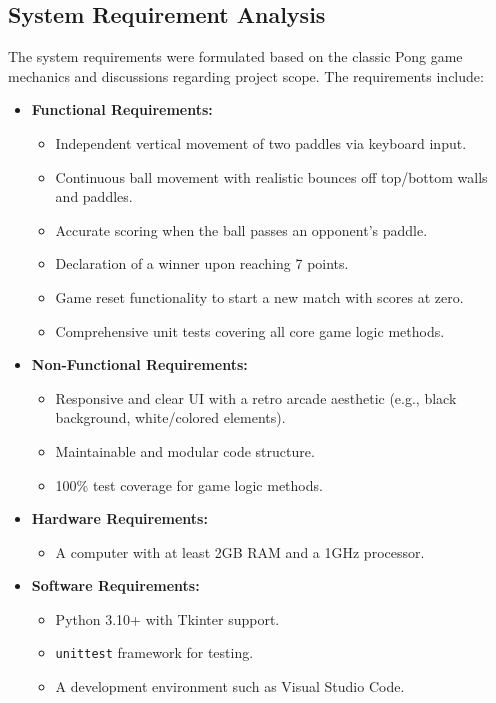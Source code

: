 \documentclass[12pt,a4paper]{article}
\begin{document}
\subsection{System Requirement Analysis}
The system requirements were formulated based on the classic Pong game mechanics and discussions regarding project scope. The requirements include:
\begin{itemize}
    \item \textbf{Functional Requirements:}
    \begin{itemize}
        \item Independent vertical movement of two paddles via keyboard input.
        \item Continuous ball movement with realistic bounces off top/bottom walls and paddles.
        \item Accurate scoring when the ball passes an opponent's paddle.
        \item Declaration of a winner upon reaching 7 points.
        \item Game reset functionality to start a new match with scores at zero.
        \item Comprehensive unit tests covering all core game logic methods.
    \end{itemize}
    \item \textbf{Non-Functional Requirements:}
    \begin{itemize}
        \item Responsive and clear UI with a retro arcade aesthetic (e.g., black background, white/colored elements).
        \item Maintainable and modular code structure.
        \item 100\% test coverage for game logic methods.
    \end{itemize}
    \item \textbf{Hardware Requirements:}
    \begin{itemize}
        \item A computer with at least 2GB RAM and a 1GHz processor.
    \end{itemize}
    \item \textbf{Software Requirements:}
    \begin{itemize}
        \item Python 3.10+ with Tkinter support.
        \item \texttt{unittest} framework for testing.
        \item A development environment such as Visual Studio Code.
    \end{itemize}
\end{itemize}
\end{document}
